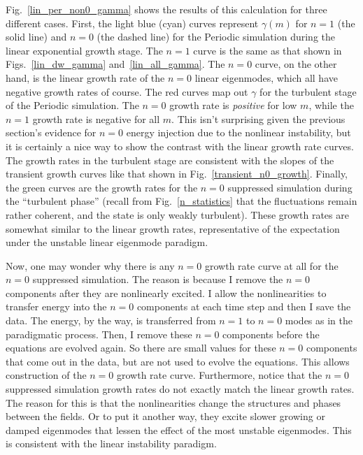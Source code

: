 Fig.~\ref{lin_per_non0_gamma} shows the results of this calculation for three different cases. First, the light blue (cyan) curves represent $\gamma(m)$ for $n=1$ (the solid line)
and $n=0$ (the dashed line) for the Periodic simulation during the linear exponential growth stage. The $n=1$ curve is the same as that shown in Figs.~\ref{lin_dw_gamma} and~\ref{lin_all_gamma}.
The $n=0$ curve, on the other hand, is the linear growth rate of the $n=0$ linear eigenmodes, which all have negative growth rates of course. The red curves map out $\gamma$ for the 
turbulent stage of the Periodic simulation. The $n=0$ growth rate is \emph{positive} for low $m$, while the $n=1$ growth rate is negative for all $m$. This isn't surprising given the
previous section's evidence for $n=0$ energy injection due to the nonlinear instability, but it is certainly a nice way to show the contrast with the linear growth rate curves.
The growth rates in the turbulent stage are consistent with the slopes of the transient growth curves like that shown in Fig.~\ref{transient_n0_growth}.
Finally, the green curves are the growth rates for the $n=0$ suppressed simulation during the ``turbulent phase'' (recall from Fig.~\ref{n_statistics} that the fluctuations remain rather
coherent, and the state is only weakly turbulent). 
These growth rates are somewhat similar to the linear growth rates, representative of the expectation under the unstable linear eigenmode paradigm. 

Now, one may wonder why there is any $n=0$ growth rate curve at all for the $n=0$ suppressed simulation. 
The reason is because I remove the $n=0$ components after they are nonlinearly excited. I allow the nonlinearities to transfer energy 
into the $n=0$ components at each time step and then I save the data. The energy, by the way, is transferred from $n=1$ to $n=0$ modes as in the paradigmatic process. Then, I remove
these $n=0$ components before the equations are evolved again. So there are small values for these $n=0$ components that come out in the data, but are not used to evolve the equations. This allows
construction of the $n=0$ growth rate curve.
Furthermore, notice that the $n=0$ suppressed simulation growth rates do not exactly match the linear growth rates. The reason for this is that the nonlinearities change the structures and
phases between the fields. Or to put it another way, they excite slower growing or damped eigenmodes that lessen the effect of the most unstable eigenmodes. This is consistent with the linear
instability paradigm.

